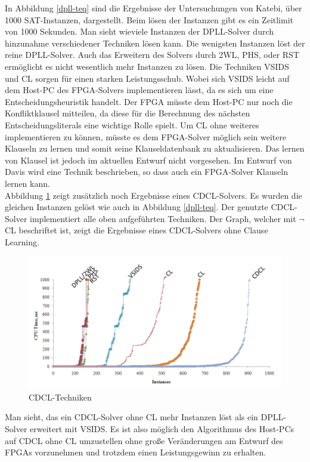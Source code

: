 In Abbildung \ref{dpll-teq} sind die Ergebnisse der Untersuchungen von Katebi, über 1000 SAT-Instanzen,
dargestellt. Beim lösen der Instanzen gibt es ein Zeitlimit von 1000 Sekunden. Man sieht wieviele Instanzen 
der DPLL-Solver durch hinzunahme verschiedener
Techniken lösen kann. Die wenigsten Instanzen löst der reine DPLL-Solver. Auch 
das Erweitern des Solvers durch 2WL, PHS, oder RST ermöglicht es nicht wesentlich
mehr Instanzen zu lösen. Die Techniken VSIDS und CL sorgen für einen starken
Leistungsschub. Wobei sich VSIDS leicht auf dem Host-PC des FPGA-Solvers implementieren
lässt, da es sich um eine Entscheidungsheuristik handelt. Der FPGA müsste dem Host-PC
nur noch die Konfliktklausel mitteilen, da diese für die Berechnung des nächsten
Entscheidungsliterals eine wichtige Rolle spielt. Um CL ohne weiteres implementieren
zu können, müsste es dem FPGA-Solver möglich sein weitere Klauseln zu lernen und
somit seine Klauseldatenbank zu aktualisieren.
Das lernen von Klausel ist jedoch im aktuellen Entwurf nicht vorgesehen. Im
Entwurf von Davis wird eine Technik beschrieben, so dass auch ein FPGA-Solver
Klauseln lernen kann.\\
Abbildung \ref{cdcl-teq} zeigt zusätzlich noch Ergebnisse eines CDCL-Solvers. Es wurden die gleichen 
Instanzen gelöst wie auch in Abbildung \ref{dpll-teq}. Der genutzte CDCL-Solver implementiert alle
oben aufgeführten Techniken. Der Graph, welcher mit $\neg$ CL
beschriftet ist, zeigt die Ergebnisse eines CDCL-Solvers ohne
Clause Learning.
\begin{figure}[h]
  \includegraphics[width=\textwidth]{abb/cdcl-teq.png}
  \caption{CDCL-Techniken \cite{katebi:2011}}
  \label{cdcl-teq}
\end{figure}
Man sieht, das ein CDCL-Solver ohne CL mehr Instanzen löst als
ein DPLL-Solver erweitert mit VSIDS. Es ist also möglich den Algorithmus
des Host-PCs auf CDCL ohne CL umzustellen ohne große Veränderungen
am Entwurf des FPGAs vorzunehmen und trotzdem einen
Leistungsgewinn zu erhalten.


